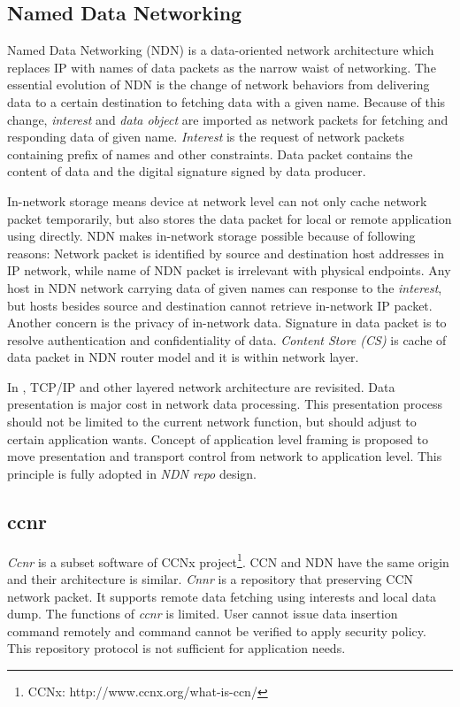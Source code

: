 \documentclass[conference]{IEEEtran}
\begin{document}
\subsection{Named Data Networking}
Named Data Networking (NDN) \cite{zhang2010named} is a data-oriented network architecture which replaces IP with names of data packets as the narrow waist of networking. The essential evolution of NDN is the change of network behaviors from delivering data to a certain destination to fetching data with a given name. \cite{zhang2010named} Because of this change, \emph{interest} and \emph{data object} are imported as network packets for fetching and responding data of given name. \emph{Interest} is the request of network packets containing prefix of names and other constraints. Data packet contains the content of data and the digital signature signed by data producer.

In-network storage means device at network level can not only cache network packet temporarily, but also stores the data packet for local or remote application using directly. NDN makes in-network storage possible because of following reasons: Network packet is identified by source and destination host addresses in IP network, while name of NDN packet is irrelevant with physical endpoints. Any host in NDN network carrying data of given names can response to the \emph{interest}, but hosts besides source and destination cannot retrieve in-network IP packet. Another concern is the privacy of in-network data. Signature in data packet is to resolve authentication and confidentiality of data. \emph{Content Store (CS)} is cache of data packet in NDN router model and it is within network layer.

In \cite{clark1990architectural}, TCP/IP and other layered network architecture are revisited. Data presentation is major cost in network data processing. This presentation process should not be limited to the current network function, but should adjust to certain application wants. Concept of application level framing is proposed to move presentation and transport control from network to application level. This principle is fully adopted in \emph{NDN repo} design.

\subsection{ccnr}
 \emph{Ccnr} is a subset software of CCNx project\footnote{CCNx: http://www.ccnx.org/what-is-ccn/}. CCN and NDN have the same origin and their architecture is similar. \emph{Cnnr} is a repository that preserving CCN network packet. It supports remote data fetching using interests and local data dump. The functions of \emph{ccnr} is limited. User cannot issue data insertion command remotely and command cannot be verified to apply security policy. This repository protocol is not sufficient for application needs.
\end{document}
